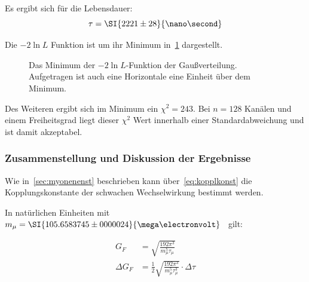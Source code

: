\documentclass[slug=LM, room=Andreas-Schubert-Bau\,\ K\ 1A, supervisor=Anne-Sophie\ Berthold, coursedate=13.\ 12.\ 2019]{../../Lab_Report_LaTeX/lab_report}
\begin{document}
Es ergibt sich f\"ur die Lebensdauer:
\begin{equation}
  \label{eq:result-poisson}
  \tau = \SI{2221\pm 28}{\nano\second}
\end{equation}

Die \(-2\ln{L}\) Funktion ist um ihr Minimum
in~\ref{fig:haupt-poisson} dargestellt.

\begin{figure}[h]\centering
  
  \caption{Das Minimum der \(-2\ln{L}\)-Funktion der
    Gaußverteilung. Aufgetragen ist auch eine Horizontale eine
    Einheit \"uber dem Minimum.}
  \label{fig:haupt-poisson}
\end{figure}

Des Weiteren ergibt sich im Minimum ein \(\chi^2=243\). Bei \(n=128\)
Kan\"alen und einem Freiheitsgrad liegt dieser \(\chi^2\) Wert
innerhalb einer Standardabweichung und ist damit akzeptabel.


\subsubsection{Zusammenstellung und Diskussion der Ergebnisse}
\label{sec:disk}

Wie in~\ref{sec:myonenenst} beschrieben kann
\"uber~\ref{eq:kopplkonst} die Kopplungskonstante der schwachen
Wechselwirkung bestimmt werden.

In nat\"urlichen Einheiten mit
\(m_\mu = \SI{105.6583745\pm
  0000024}{\mega\electronvolt}\)~\cite{codata} gilt:

\begin{align}
  \label{eq:couplingconstant}
  G_F &= \sqrt{\frac{192\pi^3}{m_\mu^5\tau_\mu}} \\
  \Delta G_F &=
  \frac{1}{2}\sqrt{\frac{192\pi^3}{m_\mu^5\tau_\mu^3}}\cdot \Delta \tau
\end{align}
\end{document}
